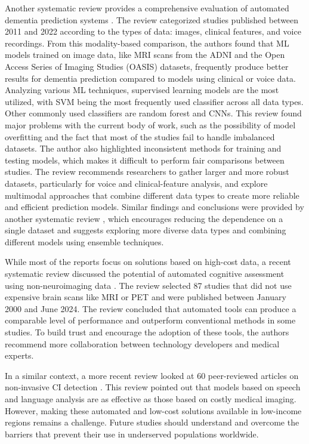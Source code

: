 Another systematic review provides a comprehensive evaluation of automated dementia prediction systems \cite{Javeed2023Machine}. The review categorized studies published between 2011 and 2022 according to the types of data: images, clinical features, and voice recordings. From this modality-based comparison, the authors found that ML models trained on image data, like MRI scans from the ADNI and the Open Access Series of Imaging Studies (\acrshort{OASIS}) datasets, frequently produce better results for dementia prediction compared to models using clinical or voice data. Analyzing various ML techniques, supervised learning models are the most utilized, with SVM being the most frequently used classifier across all data types. Other commonly used classifiers are random forest and CNNs. This review found major problems with the current body of work, such as the possibility of model overfitting and the fact that most of the studies fail to handle imbalanced datasets. The author also highlighted inconsistent methods for training and testing models, which makes it difficult to perform fair comparisons between studies. The review recommends researchers to gather larger and more robust datasets, particularly for voice and clinical-feature analysis, and explore multimodal approaches that combine different data types to create more reliable and efficient prediction models. Similar findings and conclusions were provided by another systematic review \cite{Arya2023systematic}, which encourages reducing the dependence on a single dataset and suggests exploring more diverse data types and combining different models using ensemble techniques.

While most of the reports focus on solutions based on high-cost data, a recent systematic review discussed the potential of automated cognitive assessment using non-neuroimaging data \cite{Babatope2024Potential}. The review selected 87 studies that did not use expensive brain scans like MRI or PET and were published between January 2000 and June 2024. The review concluded that automated tools can produce a comparable level of performance and outperform conventional methods in some studies. To build trust and encourage the adoption of these tools, the authors recommend more collaboration between technology developers and medical experts. 

In a similar context, a more recent review looked at 60 peer-reviewed articles on non-invasive CI detection \cite{Alsuhaibani2025Review}. This review pointed out that models based on speech and language analysis are as effective as those based on costly medical imaging. However, making these automated and low-cost solutions available in low-income regions remains a challenge. Future studies should understand and overcome the barriers that prevent their use in underserved populations worldwide.

